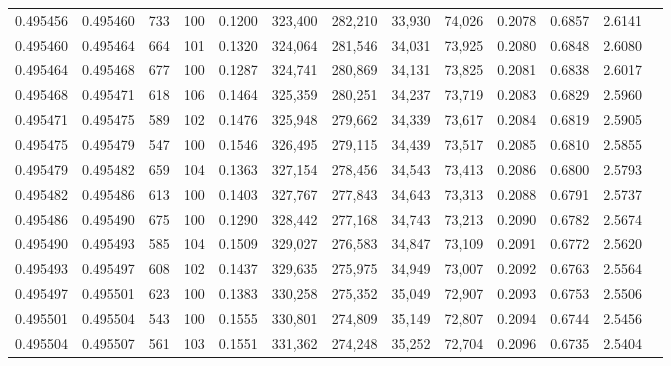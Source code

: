 \begin{tabular}{rrrrrrrrrrrrr}
0.495456 & 0.495460 &   733 & 100 &                                     0.1200 & 323,400 & 282,210 &  33,930 &  74,026 & 0.2078 & 0.6857 & 2.6141 \\
0.495460 & 0.495464 &   664 & 101 &                                     0.1320 & 324,064 & 281,546 &  34,031 &  73,925 & 0.2080 & 0.6848 & 2.6080 \\
0.495464 & 0.495468 &   677 & 100 &                                     0.1287 & 324,741 & 280,869 &  34,131 &  73,825 & 0.2081 & 0.6838 & 2.6017 \\
0.495468 & 0.495471 &   618 & 106 &                                     0.1464 & 325,359 & 280,251 &  34,237 &  73,719 & 0.2083 & 0.6829 & 2.5960 \\
0.495471 & 0.495475 &   589 & 102 &                                     0.1476 & 325,948 & 279,662 &  34,339 &  73,617 & 0.2084 & 0.6819 & 2.5905 \\
0.495475 & 0.495479 &   547 & 100 &                                     0.1546 & 326,495 & 279,115 &  34,439 &  73,517 & 0.2085 & 0.6810 & 2.5855 \\
0.495479 & 0.495482 &   659 & 104 &                                     0.1363 & 327,154 & 278,456 &  34,543 &  73,413 & 0.2086 & 0.6800 & 2.5793 \\
0.495482 & 0.495486 &   613 & 100 &                                     0.1403 & 327,767 & 277,843 &  34,643 &  73,313 & 0.2088 & 0.6791 & 2.5737 \\
0.495486 & 0.495490 &   675 & 100 &                                     0.1290 & 328,442 & 277,168 &  34,743 &  73,213 & 0.2090 & 0.6782 & 2.5674 \\
0.495490 & 0.495493 &   585 & 104 &                                     0.1509 & 329,027 & 276,583 &  34,847 &  73,109 & 0.2091 & 0.6772 & 2.5620 \\
0.495493 & 0.495497 &   608 & 102 &                                     0.1437 & 329,635 & 275,975 &  34,949 &  73,007 & 0.2092 & 0.6763 & 2.5564 \\
0.495497 & 0.495501 &   623 & 100 &                                     0.1383 & 330,258 & 275,352 &  35,049 &  72,907 & 0.2093 & 0.6753 & 2.5506 \\
0.495501 & 0.495504 &   543 & 100 &                                     0.1555 & 330,801 & 274,809 &  35,149 &  72,807 & 0.2094 & 0.6744 & 2.5456 \\
0.495504 & 0.495507 &   561 & 103 &                                     0.1551 & 331,362 & 274,248 &  35,252 &  72,704 & 0.2096 & 0.6735 & 2.5404 \\

\end{tabular}
